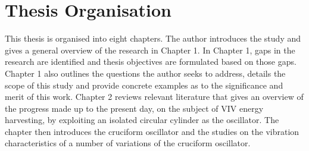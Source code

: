 \documentclass[oneside]{utmthesis}
\begin{document}


\section{Thesis Organisation} \label{sec:thesisOrg}
This thesis is organised into eight chapters. The author introduces the study and gives a general overview of the research in Chapter 1. In Chapter 1, gaps in the research are identified and thesis objectives are formulated based on those gaps. Chapter 1 also outlines the questions the author seeks to address, details the scope of this study and provide concrete examples as to the significance and merit of this work. Chapter 2 reviews relevant literature that gives an overview of the progress made up to the present day, on the subject of VIV energy harvesting, by exploiting an isolated circular cylinder as the oscillator. The chapter then introduces the cruciform oscillator and the studies on the vibration characteristics of a number of variations of the cruciform oscillator.
\end{document}
